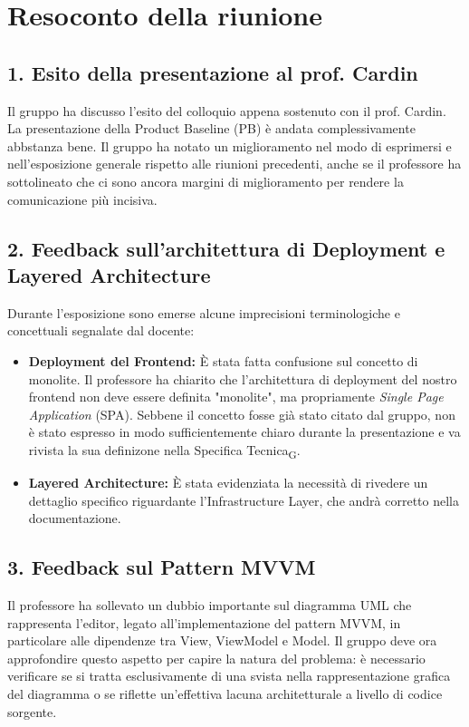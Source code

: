\documentclass[a4paper,12pt]{article}
\newcommand{\gls}[1]{#1\textsubscript{G}}
\begin{document}
\newpage

\section*{Resoconto della riunione}
\subsection*{1. Esito della presentazione al prof. Cardin}
Il gruppo ha discusso l'esito del colloquio appena sostenuto con il prof. Cardin. La presentazione della Product Baseline (PB) è andata complessivamente abbstanza bene. Il gruppo ha notato un miglioramento nel modo di esprimersi e nell'esposizione generale rispetto alle riunioni precedenti, anche se il professore ha sottolineato che ci sono ancora margini di miglioramento per rendere la comunicazione più incisiva.

\subsection*{2. Feedback sull'architettura di Deployment e Layered Architecture}
Durante l'esposizione sono emerse alcune imprecisioni terminologiche e concettuali segnalate dal docente:
\begin{itemize}
    \item \textbf{Deployment del Frontend:} È stata fatta confusione sul concetto di monolite. Il professore ha chiarito che l'architettura di deployment del nostro frontend non deve essere definita "monolite", ma propriamente \textit{Single Page Application} (SPA). Sebbene il concetto fosse già stato citato dal gruppo, non è stato espresso in modo sufficientemente chiaro durante la presentazione e va rivista la sua definizone nella \gls{Specifica Tecnica}.
    \item \textbf{Layered Architecture:} È stata evidenziata la necessità di rivedere un dettaglio specifico riguardante l'Infrastructure Layer, che andrà corretto nella documentazione.
\end{itemize}

\subsection*{3. Feedback sul Pattern MVVM}
Il professore ha sollevato un dubbio importante sul diagramma UML che rappresenta l'editor, legato all'implementazione del pattern MVVM, in particolare alle dipendenze tra View, ViewModel e Model. Il gruppo deve ora approfondire questo aspetto per capire la natura del problema: è necessario verificare se si tratta esclusivamente di una svista nella rappresentazione grafica del diagramma o se riflette un'effettiva lacuna architetturale a livello di codice sorgente.
\end{document}
